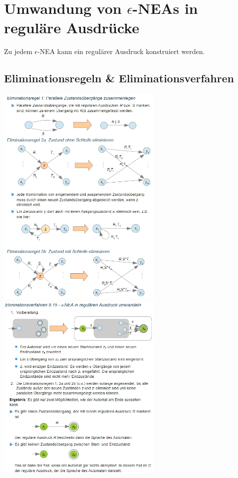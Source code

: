 \documentclass{scrreprt}
\begin{document}
\section{Umwandung von $\epsilon$-NEAs in reguläre Ausdrücke}
Zu jedem $\epsilon$-NEA kann ein regulärer Ausdruck konstruiert werden.
\subsection{Eliminationsregeln \& Eliminationsverfahren}
\includegraphics[width=0.6\textwidth]{"graphics/Eliminationsregeln"}
\includegraphics[width=0.6\textwidth]{"graphics/Eliminationsverfahren"}
\end{document}
